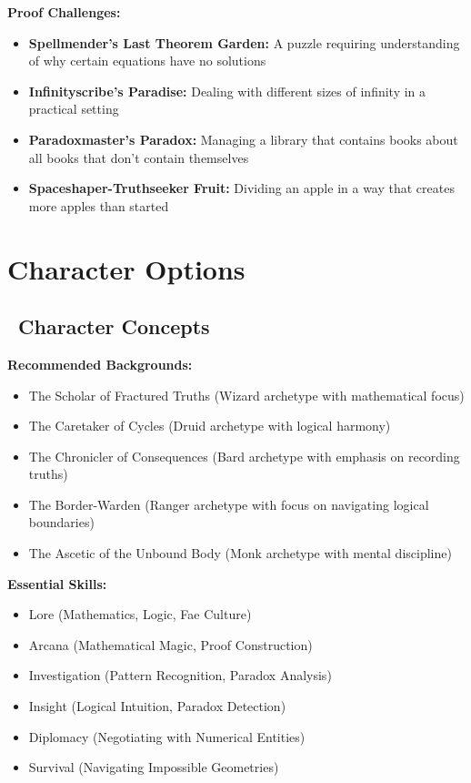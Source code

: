 \documentclass[11pt]{article}
\begin{document}
\textbf{Proof Challenges:}
\begin{itemize}
    \item \textbf{Spellmender's Last Theorem Garden:} A puzzle requiring understanding of why certain equations have no solutions
    \item \textbf{Infinityscribe's Paradise:} Dealing with different sizes of infinity in a practical setting
    \item \textbf{Paradoxmaster's Paradox:} Managing a library that contains books about all books that don't contain themselves
    \item \textbf{Spaceshaper-Truthseeker Fruit:} Dividing an apple in a way that creates more apples than started
\end{itemize}

\section{Character Options}

\subsection*{\faUser\ Character Concepts}

\textbf{Recommended Backgrounds:}
\begin{itemize}
    \item The Scholar of Fractured Truths (Wizard archetype with mathematical focus)
    \item The Caretaker of Cycles (Druid archetype with logical harmony)
    \item The Chronicler of Consequences (Bard archetype with emphasis on recording truths)
    \item The Border-Warden (Ranger archetype with focus on navigating logical boundaries)
    \item The Ascetic of the Unbound Body (Monk archetype with mental discipline)
\end{itemize}

\textbf{Essential Skills:}
\begin{itemize}
    \item Lore (Mathematics, Logic, Fae Culture)
    \item Arcana (Mathematical Magic, Proof Construction)
    \item Investigation (Pattern Recognition, Paradox Analysis)
    \item Insight (Logical Intuition, Paradox Detection)
    \item Diplomacy (Negotiating with Numerical Entities)
    \item Survival (Navigating Impossible Geometries)
\end{itemize}
\end{document}
